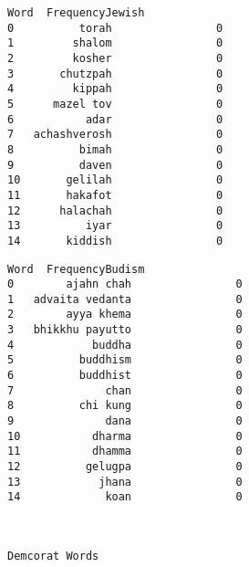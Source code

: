 \documentclass[11pt]{article}
\begin{document}
            \begin{tcolorbox}[breakable, size=fbox, boxrule=.5pt, pad at break*=1mm, opacityfill=0]
\begin{Verbatim}[commandchars=\\\{\}]
            Word  FrequencyJewish
0          torah                0
1         shalom                0
2         kosher                0
3       chutzpah                0
4         kippah                0
5      mazel tov                0
6           adar                0
7   achashverosh                0
8          bimah                0
9          daven                0
10       gelilah                0
11       hakafot                0
12      halachah                0
13          iyar                0
14       kiddish                0
\end{Verbatim}
\end{tcolorbox}
        
            \begin{tcolorbox}[breakable, size=fbox, boxrule=.5pt, pad at break*=1mm, opacityfill=0]
\begin{Verbatim}[commandchars=\\\{\}]
               Word  FrequencyBudism
0        ajahn chah                0
1   advaita vedanta                0
2        ayya khema                0
3   bhikkhu payutto                0
4            buddha                0
5          buddhism                0
6          buddhist                0
7              chan                0
8          chi kung                0
9              dana                0
10           dharma                0
11           dhamma                0
12          gelugpa                0
13            jhana                0
14             koan                0
\end{Verbatim}
\end{tcolorbox}
        
    \begin{center}
    \end{center}
    { \hspace*{\fill} \\}
    
    \begin{Verbatim}[commandchars=\\\{\}]
Demcorat Words
    \end{Verbatim}

    \begin{center}
    \end{center}
    { \hspace*{\fill} \\}
    
\end{document}
